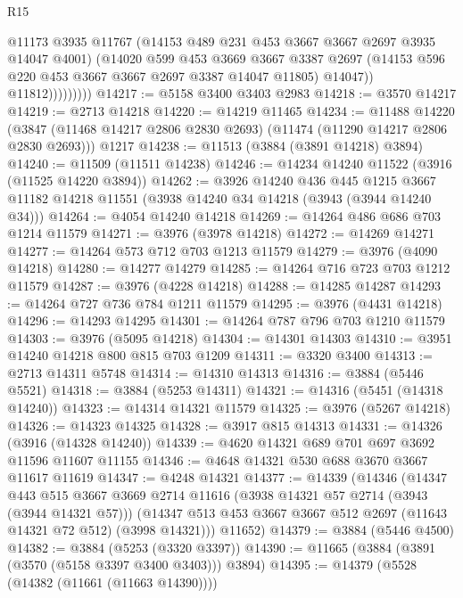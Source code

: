 \begin{lexlean}{R15}
\begin{coremodule}
                        @11173
                        @3935
                        @11767
                        (@14153 @489 @231 @453 @3667 @3667 @2697 @3935 @14047 @4001)
                        (@14020
                          @599
                          @453
                          @3669
                          @3667
                          @3387
                          @2697
                          (@14153 @596 @220 @453 @3667 @3667 @2697 @3387 @14047 @11805)
                          @14047))
                      @11812)))))))))
@14217 := @5158 @3400 @3403 @2983
@14218 := @3570 @14217
@14219 := @2713 @14218
@14220 := @14219 @11465
@14234 := @11488
    @14220
    (@3847 (@11468 @14217 @2806 @2830 @2693) (@11474 (@11290 @14217 @2806 @2830 @2693)))
    @1217
@14238 := @11513 (@3884 (@3891 @14218) @3894)
@14240 := @11509 (@11511 @14238)
@14246 := @14234 @14240 @11522 (@3916 (@11525 @14220 @3894))
@14262 := @3926
    @14240
    @436
    @445
    @1215
    @3667
    @11182
    @14218
    @11551
    (@3938 @14240 @34 @14218 (@3943 (@3944 @14240 @34)))
@14264 := @4054 @14240 @14218
@14269 := @14264 @486 @686 @703 @1214 @11579
@14271 := @3976 (@3978 @14218)
@14272 := @14269 @14271
@14277 := @14264 @573 @712 @703 @1213 @11579
@14279 := @3976 (@4090 @14218)
@14280 := @14277 @14279
@14285 := @14264 @716 @723 @703 @1212 @11579
@14287 := @3976 (@4228 @14218)
@14288 := @14285 @14287
@14293 := @14264 @727 @736 @784 @1211 @11579
@14295 := @3976 (@4431 @14218)
@14296 := @14293 @14295
@14301 := @14264 @787 @796 @703 @1210 @11579
@14303 := @3976 (@5095 @14218)
@14304 := @14301 @14303
@14310 := @3951 @14240 @14218 @800 @815 @703 @1209
@14311 := @3320 @3400
@14313 := @2713 @14311 @5748
@14314 := @14310 @14313
@14316 := @3884 (@5446 @5521)
@14318 := @3884 (@5253 @14311)
@14321 := @14316 (@5451 (@14318 @14240))
@14323 := @14314 @14321 @11579
@14325 := @3976 (@5267 @14218)
@14326 := @14323 @14325
@14328 := @3917 @815 @14313
@14331 := @14326 (@3916 (@14328 @14240))
@14339 := @4620 @14321 @689 @701 @697 @3692 @11596 @11607 @11155
@14346 := @4648 @14321 @530 @688 @3670 @3667 @11617 @11619
@14347 := @4248 @14321
@14377 := @14339
    (@14346
      (@14347
        @443
        @515
        @3667
        @3669
        @2714
        @11616
        (@3938 @14321 @57 @2714 (@3943 (@3944 @14321 @57)))
        (@14347 @513 @453 @3667 @3667 @512 @2697 (@11643 @14321 @72 @512) (@3998 @14321)))
      @11652)
@14379 := @3884 (@5446 @4500)
@14382 := @3884 (@5253 (@3320 @3397))
@14390 := @11665 (@3884 (@3891 (@3570 (@5158 @3397 @3400 @3403))) @3894)
@14395 := @14379 (@5528 (@14382 (@11661 (@11663 @14390))))

\end{coremodule}
\end{lexlean}
